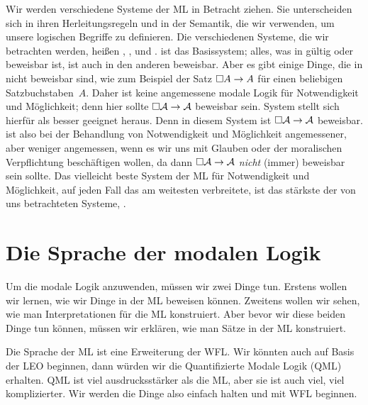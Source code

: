 Wir werden verschiedene Systeme der ML in Betracht ziehen. Sie unterscheiden sich in ihren Herleitungsregeln und in der Semantik, die wir verwenden, um unsere logischen Begriffe zu definieren. Die verschiedenen Systeme, die wir betrachten werden, heißen \mlK, \mlT, \mlSfour und \mlSfive. \mlK{} ist das Basissystem; alles, was in \mlK{} gültig oder beweisbar ist, ist auch in den anderen beweisbar. Aber es gibt einige Dinge, die in \mlK{} nicht beweisbar sind, wie zum Beispiel der Satz $\Box A \rightarrow A$ für einen beliebigen Satzbuchstaben~$A$. Daher ist \mlK{} keine angemessene modale Logik für Notwendigkeit und Möglichkeit; denn hier sollte $\Box\mathcal{A} \rightarrow \mathcal{A}$ beweisbar sein. System \mlT stellt sich hierfür als besser geeignet heraus. Denn in diesem System ist $\Box\mathcal{A} \rightarrow \mathcal{A}$ beweisbar. \mlT{} ist also bei der Behandlung von Notwendigkeit und Möglichkeit angemessener, aber weniger angemessen, wenn es wir uns mit Glauben oder der moralischen Verpflichtung beschäftigen wollen, da dann $\Box\mathcal{A} \rightarrow \mathcal{A}$ \emph{nicht} (immer) beweisbar sein sollte. Das vielleicht beste System der ML für Notwendigkeit und Möglichkeit, auf jeden Fall das am weitesten verbreitete, ist das stärkste der von uns betrachteten Systeme, \mlSfive.

\section{Die Sprache der modalen Logik}
\label{TFLtoML}

Um die modale Logik anzuwenden, müssen wir zwei Dinge tun. Erstens wollen wir lernen, wie wir Dinge in der ML beweisen können. Zweitens wollen wir sehen, wie man Interpretationen für die ML konstruiert. Aber bevor wir diese beiden Dinge tun können, müssen wir erklären, wie man Sätze in der ML konstruiert.

Die Sprache der ML ist eine Erweiterung der WFL. Wir könnten auch auf Basis der LEO beginnen, dann würden wir die Quantifizierte Modale Logik (QML) erhalten. QML ist viel ausdrucksstärker als die ML, aber sie ist auch viel, viel komplizierter. Wir werden die Dinge also einfach halten und mit WFL beginnen.

